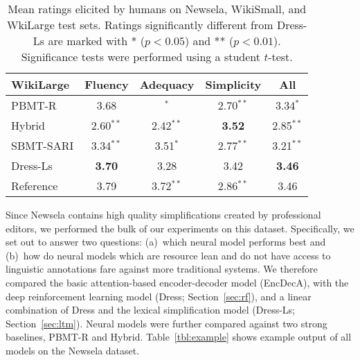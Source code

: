 \documentclass[11pt,letterpaper]{article}
\begin{document}
\begin{table}[t]
\begin{tabular}{|@{~} l@{~} |@{~} c@{~} c@{~}  c@{~}  c@{~} |}
		WikiLarge & Fluency & Adequacy & Simplicity & All \\\hline \hline
		PBMT-R & 3.68 & \hspace{1ex}{\bf 3.63}$^{*}$ & \hspace{2ex}2.70$^{**}$ & \hspace{1ex}3.34$^{*}$ \\
		Hybrid & \hspace{2ex}2.60$^{**}$ & \hspace{2ex}2.42$^{**}$ & {\bf 3.52} & \hspace{2ex}2.85$^{**}$ \\
		SBMT-SARI & \hspace{2ex}3.34$^{**}$ & \hspace{1ex}3.51$^{*}$ & \hspace{2ex}2.77$^{**}$ & \hspace{2ex}3.21$^{**}$ \\
		{\sc Dress-Ls} & {\bf 3.70} & 3.28 & {3.42} & {\bf 3.46}
		\\
		Reference & 3.79 & \hspace{2ex}3.72$^{**}$ & \hspace{2ex}2.86$^{**}$ & 3.46 \\
		\hline
	\end{tabular}
\caption{Mean ratings elicited by humans on Newsela, WikiSmall,
		and WkiLarge test sets. Ratings
		significantly different from {\sc Dress-Ls} are marked
		with * (\mbox{$p<0.05$}) and ** (\mbox{$p<0.01$}). Significance tests were performed using a student
		\mbox{$t$-test}.} 
	\label{tbl:human-newsela}
\end{table}


Since Newsela contains high quality simplifications created by
professional editors, we performed the bulk of our experiments on this
dataset. Specifically, we set out to answer two questions: (a)~which
neural model performs best and (b)~how do neural models which are
resource lean and do not have access to linguistic annotations fare
against more traditional systems. We therefore compared the basic
attention-based encoder-decoder model (EncDecA), with the deep
reinforcement learning model ({\sc Dress}; Section~\ref{sec:rf}), and a
linear combination of {\sc Dress} and the lexical simplification model
({\sc Dress-Ls}; Section~\ref{sec:ltm}).  Neural models were further
compared against two strong baselines, PBMT-R and Hybrid.
Table~\ref{tbl:example} shows example output of all models on the
Newsela dataset.
\end{document}
